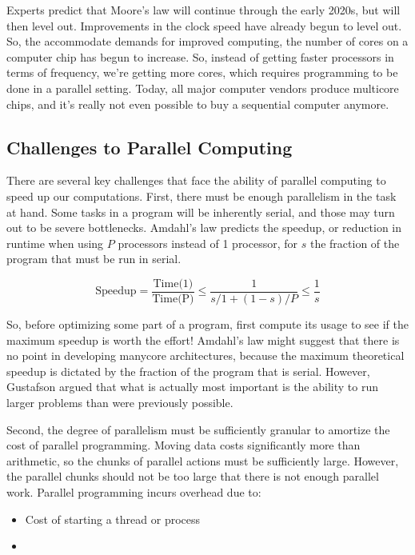 \documentclass[10pt]{article}
\begin{document}
\begin{flushleft}
Experts predict that Moore's law will continue through the early 2020s, but will then level out. Improvements in the clock speed have already begun to level out. So, the accommodate demands for improved computing, the number of cores on a computer chip has begun to increase. So, instead of getting faster processors in terms of frequency, we're getting more cores, which requires programming to be done in a parallel setting. Today, all major computer vendors produce multicore chips, and it's really not even possible to buy a sequential computer anymore.

\subsection{Challenges to Parallel Computing}

There are several key challenges that face the ability of parallel computing to speed up our computations. First, there must be enough parallelism in the task at hand. Some tasks in a program will be inherently serial, and those may turn out to be severe bottlenecks. Amdahl's law predicts the speedup, or reduction in runtime when using \(P\) processors instead of 1 processor, for \(s\) the fraction of the program that must be run in serial.

\begin{equation}
\textrm{Speedup}=\frac{\textrm{Time(1)}}{\textrm{Time(P)}}\leq\frac{1}{s/1+(1-s)/P}\leq\frac{1}{s}
\end{equation}

So, before optimizing some part of a program, first compute its usage to see if the maximum speedup is worth the effort! Amdahl's law might suggest that there is no point in developing manycore architectures, because the maximum theoretical speedup is dictated by the fraction of the program that is serial. However, Gustafson argued that what is actually most important is the ability to run larger problems than were previously possible.

Second, the degree of parallelism must be sufficiently granular to amortize the cost of parallel programming. Moving data costs significantly more than arithmetic, so the chunks of parallel actions must be sufficiently large. However, the parallel chunks should not be too large that there is not enough parallel work. Parallel programming incurs overhead due to:

\begin{itemize}
\item Cost of starting a thread or process
\item 
\end{itemize}


\end{flushleft}
\end{document}
